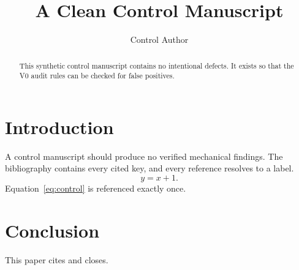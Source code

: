 \documentclass[conference]{IEEEtran}
\title{A Clean Control Manuscript}
\author{Control Author}
\begin{document}
\maketitle

\begin{abstract}
This synthetic control manuscript contains no intentional defects. It exists so that the V0 audit rules can be checked for false positives.
\end{abstract}

\section{Introduction}
\label{sec:intro}
A control manuscript should produce no verified mechanical findings.
The bibliography contains every cited key, and every reference resolves to a label.
\begin{equation}
\label{eq:control}
y = x + 1.
\end{equation}
Equation~\ref{eq:control} is referenced exactly once.

\section{Conclusion}
\label{sec:conclusion}
This paper cites \cite{control2020} and closes.



\end{document}
